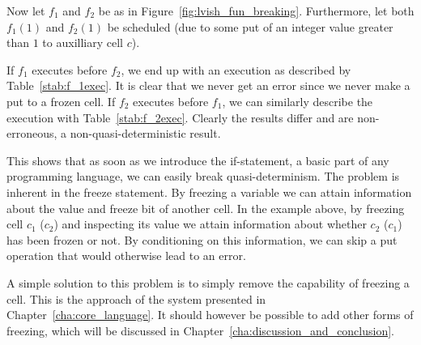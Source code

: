 Now let $f_1$ and $f_2$ be as in Figure~\ref{fig:lvish_fun_breaking}.
Furthermore, let both $f_1(1)$ and $f_2(1)$ be scheduled (due to some put of
an integer value greater than $1$ to auxilliary cell $c$).

If $f_1$ executes before $f_2$, we end up with an execution as described by
Table~\ref{stab:f_1exec}. It is clear that we never get an error since we
never make a put to a frozen cell.  If $f_2$ executes before $f_1$, we can
similarly describe the execution with Table~\ref{stab:f_2exec}. Clearly the
results differ and are non-erroneous, a non-quasi-deterministic result.

This shows that as soon as we introduce the if-statement, a basic part of any
programming language, we can easily break quasi-determinism. The problem is inherent
in the freeze statement. By freezing a variable we can attain information
about the value and freeze bit of another cell. In the example above, by
freezing cell $c_1$ ($c_2$) and inspecting its value we attain information
about whether $c_2$ ($c_1$) has been frozen or not. By conditioning on this
information, we can skip a put operation that would otherwise lead to an error.

A simple solution to this problem is to simply remove the capability of freezing
a cell. This is the approach of the system presented in
Chapter~\ref{cha:core_language}. It should however be possible to add other
forms of freezing, which will be discussed in
Chapter~\ref{cha:discussion_and_conclusion}.

